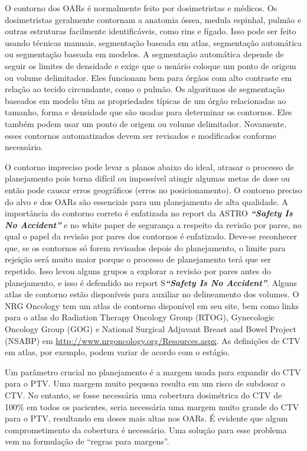 \documentclass[11pt,a4paper]{article}
\newcounter{exemplo}
\begin{document}
	O contorno dos OARs é normalmente feito por dosimetristas e médicos. Os dosimetristas geralmente contornam a anatomia óssea, medula espinhal, pulmão e outras estruturas facilmente identificáveis, como rins e fígado. Isso pode ser feito usando técnicas manuais, segmentação baseada em atlas, segmentação automática ou segmentação baseada em modelos. A segmentação automática depende de seguir os limites de densidade e exige que o usuário coloque um ponto de origem ou volume delimitador. Eles funcionam bem para órgãos com alto contraste em relação ao tecido circundante, como o pulmão. Os algoritmos de segmentação baseados em modelo têm as propriedades típicas de um órgão relacionadas ao tamanho, forma e densidade que são usadas para determinar os contornos. Eles também podem usar um ponto de origem ou volume delimitador. Novamente, esses contornos automatizados devem ser revisados e modificados conforme necessário.

	O contorno impreciso pode levar a planos abaixo do ideal, atrasar o processo de planejamento pois torna difícil ou impossível atingir algumas metas de dose ou então pode causar erros geográficos (erros no posicionamento). O contorno preciso do alvo e dos OARs são essenciais para um planejamento de alta qualidade. A importância do contorno correto é enfatizada no report da ASTRO \textbf{\textit{``Safety Is No Accident''}} e no white paper de segurança a respeito da revisão por pares, no qual o papel da revisão por pares dos contornos é enfatizado. Deve-se reconhecer que, se os contornos só forem revisados depois do planejamento, o limite para rejeição será muito maior porque o processo de planejamento terá que ser repetido. Isso levou alguns grupos a explorar a revisão por pares antes do planejamento, e isso é defendido no report  S\textbf{\textit{``Safety Is No Accident''}}. Alguns atlas de contorno estão disponíveis para auxiliar no delineamento dos volumes. O NRG Oncology tem um atlas de contorno disponível em seu site, bem como links para o atlas do Radiation Therapy Oncology Group (RTOG), Gynecologic Oncology Group (GOG) e National Surgical Adjuvant Breast and Bowel Project (NSABP) em \href{http://www.nrgoncology.org/Resources.aspx}{http://www.nrgoncology.org/Resources.aspx}. As definições de CTV em atlas, por exemplo, podem variar de acordo com o estágio.

	
	Um parâmetro crucial no planejamento é a margem usada para expandir do CTV para o PTV. Uma margem muito pequena resulta em um risco de subdosar o CTV. No entanto, se fosse necessária uma cobertura dosimétrica do CTV de 100\% em todos os pacientes, seria necessária uma margem muito grande do CTV para o PTV, resultando em doses mais altas nos OARs. É evidente que algum comprometimento da cobertura é necessário. Uma solução para esse problema vem na formulação de ``regras para margens''.
\end{document}
